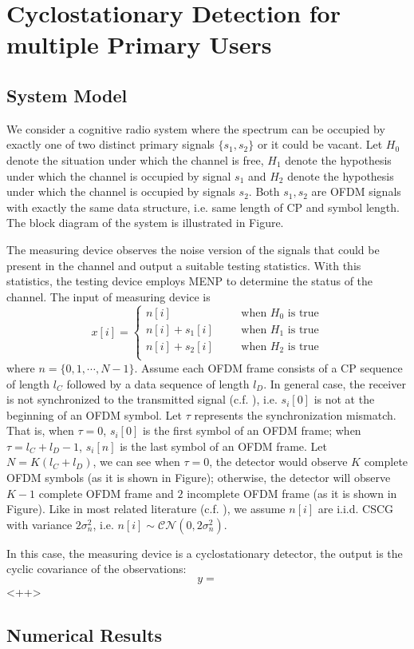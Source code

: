 \section{Cyclostationary Detection for multiple Primary Users}
\subsection{System Model}

We consider a cognitive radio system where the spectrum can be occupied by exactly one of two distinct primary signals $\{s_1, s_2\}$ or it could be vacant. Let $H_0$ denote the situation under which the channel is free, $H_1$ denote the hypothesis under which the channel is occupied by signal $s_1$ and $H_2$ denote the hypothesis under which the channel is occupied by signals $s_2$. Both $s_1, s_2$ are OFDM signals with exactly the same data structure, i.e. same length of CP and symbol length. The block diagram of the system is illustrated in Figure.

The measuring device observes the noise version of the signals that could be present in the channel and output a suitable testing statistics. With this statistics, the testing device employs MENP to determine the status of the channel. The input of measuring device is
\begin{equation}
  {x}[i] = \begin{cases}
	{n}[i]\;\;\;\;\;\;&\text{when $H_0$ is true}\\
	{n}[i]+s_1[i]\;\;\;\;\;\;&\text{when $H_1$ is true}\\
	{n}[i]+s_2[i]\;\;\;\;\;\;&\text{when $H_2$ is true}\\
  \end{cases}
  \label{equ:1209a1}
\end{equation}
where $n = \{0, 1, \cdots, N-1\}$. Assume each OFDM frame consists of  a CP sequence of length $l_C$ followed by a data sequence of length $l_D$. In general case, the receiver is not synchronized to the transmitted signal (c.f. ), i.e. $s_i[0]$ is not at the beginning of an OFDM symbol. Let $\tau$ represents the synchronization mismatch. That is, when $\tau = 0$, $s_i[0]$ is the first symbol of an OFDM frame; when $\tau = l_C+l_D -1$, $s_i[n]$ is the last symbol of an OFDM frame. Let $N = K(l_C + l_D)$, we can see when $\tau=0$, the detector would observe $K$ complete  OFDM symbols (as it is shown in Figure); otherwise, the detector will observe $K-1$ complete OFDM frame and $2$ incomplete OFDM frame (as it is shown in Figure). Like in most related literature (c.f. ), we assume  $n[i]$ are i.i.d. CSCG with variance $2\sigma_n^2$, i.e. $n[i] \sim \mathcal{CN}(0, 2\sigma_n^2)$. 

In this case, the measuring device is a cyclostationary detector, the output is the  cyclic covariance of the observations:
\begin{equation}
  y = 
  \label{<++>}
\end{equation}<++>


 

\subsection{Numerical Results}

